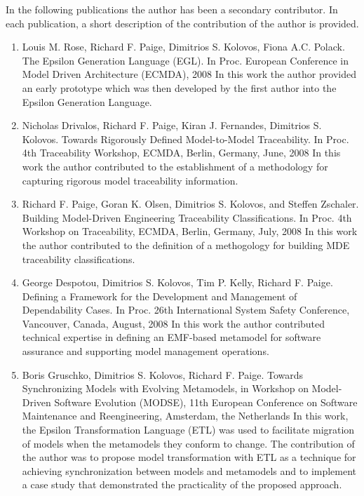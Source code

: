 In the following publications the author has been a secondary contributor. In each publication, a short description of the contribution of the author is provided.

\begin{enumerate}


	\item Louis M. Rose, Richard F. Paige, Dimitrios S. Kolovos, Fiona A.C. Polack. The Epsilon Generation Language (EGL). In Proc. European Conference in Model Driven Architecture (ECMDA), 2008
	\subitem In this work the author provided an early prototype which was then developed by the first author into the Epsilon Generation Language.
	
	\item Nicholas Drivalos, Richard F. Paige, Kiran J. Fernandes, Dimitrios S. Kolovos. Towards Rigorously Defined Model-to-Model Traceability. In Proc. 4th Traceability Workshop, ECMDA, Berlin, Germany, June, 2008
	\subitem In this work the author contributed to the establishment of a methodology for capturing rigorous model traceability information.
	
	\item Richard F. Paige, Goran K. Olsen, Dimitrios S. Kolovos, and Steffen Zschaler. Building Model-Driven Engineering Traceability Classifications. In Proc. 4th Workshop on Traceability, ECMDA, Berlin, Germany, July, 2008
	\subitem In this work the author contributed to the definition of a methogology for building MDE traceability classifications.
	
	\item George Despotou, Dimitrios S. Kolovos, Tim P. Kelly, Richard F. Paige. Defining a Framework for the Development and Management of Dependability Cases. In Proc. 26th International System Safety Conference, Vancouver, Canada, August, 2008
	\subitem In this work the author contributed technical expertise in defining an EMF-based metamodel for software assurance and supporting model management operations. 
	
	\item Boris Gruschko, Dimitrios S. Kolovos, Richard F. Paige. Towards Synchronizing Models with Evolving Metamodels, in Workshop on Model-Driven Software Evolution (MODSE), 11th European Conference on Software Maintenance and Reengineering, Amsterdam, the Netherlands
	\subitem In this work, the Epsilon Transformation Language (ETL) was used to facilitate migration of models when the metamodels they conform to change. The contribution of the author was to propose model transformation with ETL as a technique for achieving synchronization between models and metamodels and to implement a case study that demonstrated the practicality of the proposed approach.
	

\end{enumerate}
